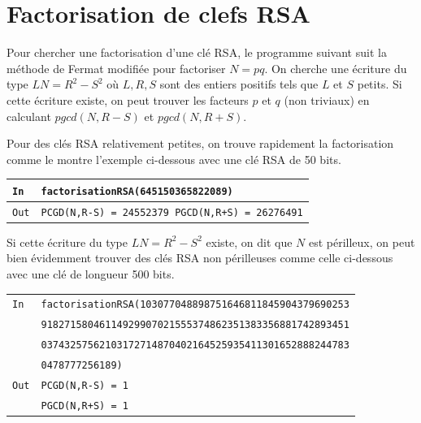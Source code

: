 \documentclass[titlepage]{article}
\begin{document}
    \section{Factorisation de clefs RSA}
    Pour chercher une factorisation d'une clé RSA, le programme suivant suit la méthode de Fermat modifiée pour factoriser $N = pq$.
    On cherche une écriture du type $LN = R^2 - S^2$ où $L,R,S$ sont des entiers positifs tels que $L$ et $S$ petits.
    Si cette écriture existe, on peut trouver les facteurs $p$ et $q$ (non triviaux) en calculant $pgcd(N,R-S)$ et $ pgcd(N,R+S)$.

    

    Pour des clés RSA relativement petites, on trouve rapidement la factorisation comme le montre l'exemple ci-dessous avec une clé RSA de 50 bits. \bigbreak

    \begin{tabularx}{12cm}{|p{0.60cm}|X|}
        \hline
        \rowcolor{gray}
        \texttt{In}
        & 
        \texttt{factorisationRSA(645150365822089)}
        \\
        \hline
        \texttt{Out}
        &
        \texttt{PCGD(N,R-S) =  24552379 \newline
        PGCD(N,R+S) =  26276491}
        \\
        \hline
    \end{tabularx}
    \bigbreak
    
    Si cette écriture du type $LN = R^2 - S^2$ existe, on dit que $N$ est périlleux, on peut bien évidemment trouver des clés RSA non périlleuses comme celle ci-dessous avec une clé de longueur 500 bits.\bigbreak
    
    \begin{tabularx}{12cm}{|p{0.60cm}|X|}
        \hline
        \rowcolor{gray} \texttt{In} & \texttt{factorisationRSA(103077048898751646811845904379690253} \\
        \rowcolor{gray} & \texttt{91827158046114929907021555374862351383356881742893451} \\
        \rowcolor{gray} & \texttt{03743257562103172714870402164525935411301652888244783} \\
        \rowcolor{gray} & \texttt{0478777256189)} \\
        \hline
        \texttt{Out} & \texttt{PCGD(N,R-S) =  1} \\
        & \texttt{PGCD(N,R+S) =  1} \\
        \hline
    \end{tabularx}
    \bigbreak
    
\end{document}
